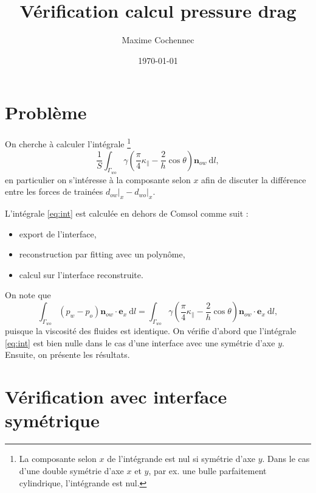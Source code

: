 \documentclass[justified]{tufte-handout}
\author{Maxime Cochennec}
\date{\today}
\title{Vérification calcul pressure drag}
\begin{document}
\maketitle
\tableofcontents



\section{Problème}
\label{sec:org62e5345}

On cherche à calculer l'intégrale \footnote{La composante selon \(x\) de l'intégrande est nul si symétrie
d'axe \(y\). Dans le cas d'une double symétrie d'axe \(x\) et \(y\), par
ex. une bulle parfaitement cylindrique, l'intégrande est nul.}
\begin{equation}\label{eq:int}
\frac{1}{S}\int_{\Gamma_{wo}}\gamma\left(\frac{\pi}{4}\kappa_{\parallel}-\frac{2}{h}\cos\theta\right)\mathbf{n}_{ow}  \:\mathrm{d}l,
\end{equation}
en particulier on s'intéresse à la composante selon \(x\) afin de
discuter la différence entre les forces de trainées \(d_{ow} \vert_x -
d_{wo}\vert_x\).


\vspace{0.8cm}
\noindent
L'intégrale \ref{eq:int} est calculée en
dehors de Comsol comme suit :
\begin{itemize}
\item export de l'interface,
\item reconstruction par fitting avec un polynôme,
\item calcul sur l'interface reconstruite.
\end{itemize}
\noindent
On note que
\begin{equation}
\int_{\Gamma_{wo}}(p_{w}-p_{o})\mathbf{n}_{ow}\cdot\mathbf{e}_{x}\:\mathrm{d}l=\int_{\Gamma_{wo}}\gamma\left(\frac{\pi}{4}\kappa_{\parallel}-\frac{2}{h}\cos\theta\right)\mathbf{n}_{ow}\cdot\mathbf{e}_{x}\:\mathrm{d}l,
\end{equation}
\noindent puisque la viscosité des fluides est identique. On vérifie
d'abord que l'intégrale \ref{eq:int} est bien nulle dans le cas d'une
interface avec une symétrie d'axe \(y\). Ensuite, on présente les résultats.

\section{Vérification avec interface symétrique}
\label{sec:org7ecbd00}
\end{document}
